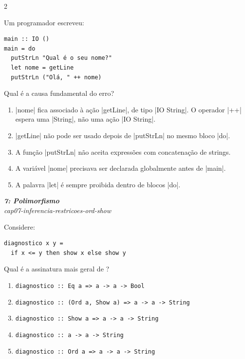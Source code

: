 \documentclass[a4paper,10pt,brazil]{article}
\begin{document}
\begin{multicols}{2}
\begin{flushright}
\end{flushright}
Um programador escreveu:

\begin{verbatim}
main :: IO ()
main = do
  putStrLn "Qual é o seu nome?"
  let nome = getLine
  putStrLn ("Olá, " ++ nome)
\end{verbatim}

Qual é a causa fundamental do erro?

\begin{enumerate}
  \item \haskellinline|nome| fica associado à ação \haskellinline|getLine|, de tipo \haskellinline|IO String|. O operador \haskellinline|++| espera uma \haskellinline|String|, não uma ação \haskellinline|IO String|.

  \item \haskellinline|getLine| não pode ser usado depois de \haskellinline|putStrLn| no mesmo bloco \haskellinline|do|.

  \item A função \haskellinline|putStrLn| não aceita expressões com concatenação de strings.

  \item A variável \haskellinline|nome| precisava ser declarada globalmente antes de \haskellinline|main|.

  \item A palavra \haskellinline|let| é sempre proibida dentro de blocos \haskellinline|do|.


\end{enumerate}

\begin{flushright}
  \footnotesize
  \textit{\textbf{7: Polimorfismo}}\\
  \textit{cap07-inferencia-restricoes-ord-show}\\

\end{flushright}
Considere:

\begin{verbatim}
diagnostico x y =
  if x <= y then show x else show y
\end{verbatim}

Qual é a assinatura mais geral de ?

\begin{enumerate}
  \item \texttt{diagnostico :: Eq a => a -> a -> Bool}
  \item \texttt{diagnostico :: (Ord a, Show a) => a -> a -> String}
  \item \texttt{diagnostico :: Show a => a -> a -> String}
  \item \texttt{diagnostico :: a -> a -> String}
  \item \texttt{diagnostico :: Ord a => a -> a -> String}


\end{enumerate}
\end{multicols}
\end{document}
